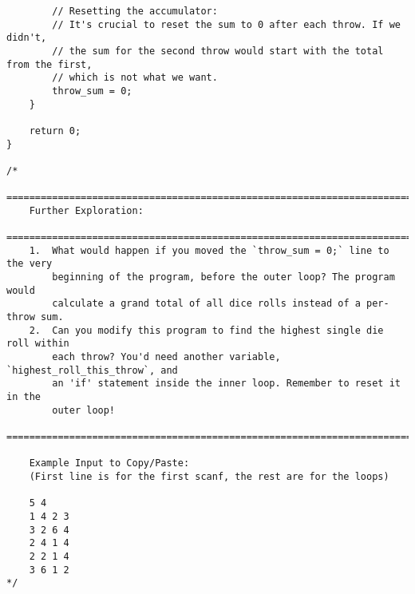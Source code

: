 \documentclass[11pt]{book}
\begin{document}
\begin{verbatim}
        // Resetting the accumulator:
        // It's crucial to reset the sum to 0 after each throw. If we didn't,
        // the sum for the second throw would start with the total from the first,
        // which is not what we want.
        throw_sum = 0;
    }

    return 0;
}

/*
    ================================================================================
    Further Exploration:
    ================================================================================
    1.  What would happen if you moved the `throw_sum = 0;` line to the very
        beginning of the program, before the outer loop? The program would
        calculate a grand total of all dice rolls instead of a per-throw sum.
    2.  Can you modify this program to find the highest single die roll within
        each throw? You'd need another variable, `highest_roll_this_throw`, and
        an 'if' statement inside the inner loop. Remember to reset it in the
        outer loop!
    ================================================================================

    Example Input to Copy/Paste:
    (First line is for the first scanf, the rest are for the loops)

    5 4
    1 4 2 3
    3 2 6 4
    2 4 1 4
    2 2 1 4
    3 6 1 2
*/

\end{verbatim}
\clearpage
\end{document}
